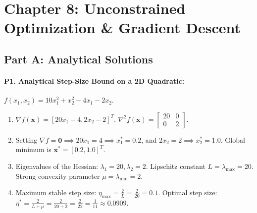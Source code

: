 \section*{Chapter 8: Unconstrained Optimization \& Gradient Descent}

\subsection*{Part A: Analytical Solutions}

\paragraph{P1. Analytical Step-Size Bound on a 2D Quadratic:}
$f(x_1, x_2) = 10 x_1^2 + x_2^2 - 4x_1 - 2x_2$.
\begin{enumerate}[label=(\alph*)]
    \item $\nabla f(\mathbf{x}) = [20x_1 - 4, 2x_2 - 2]^T$.
    $\nabla^2 f(\mathbf{x}) = \begin{bmatrix} 20 & 0 \\ 0 & 2 \end{bmatrix}$.
    \item Setting $\nabla f = \mathbf{0} \implies 20x_1 = 4 \implies x_1^* = 0.2$, and $2x_2 = 2 \implies x_2^* = 1.0$.
    Global minimum is $\mathbf{x}^* = [0.2, 1.0]^T$.
    \item Eigenvalues of the Hessian: $\lambda_1 = 20, \lambda_2 = 2$.
    Lipschitz constant $L = \lambda_{\max} = 20$.
    Strong convexity parameter $\mu = \lambda_{\min} = 2$.
    \item Maximum stable step size: $\eta_{\max} = \frac{2}{L} = \frac{2}{20} = 0.1$.
    Optimal step size: $\eta^* = \frac{2}{L + \mu} = \frac{2}{20 + 2} = \frac{2}{22} = \frac{1}{11} \approx 0.0909$.
\end{enumerate}

